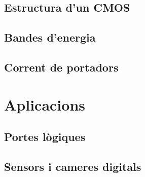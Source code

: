 \documentclass[11pt,a4paper]{article}
\begin{document}
\subsection{Estructura d'un CMOS}

\subsection{Bandes d'energia}

\subsection{Corrent de portadors}


\section{Aplicacions}

\subsection{Portes lògiques}

\subsection{Sensors i cameres digitals}

\printbibliography
\end{document}
